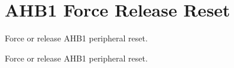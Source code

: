 \hypertarget{group___r_c_c_ex___a_h_b1___force___release___reset}{}\section{A\+H\+B1 Force Release Reset}
\label{group___r_c_c_ex___a_h_b1___force___release___reset}


Force or release A\+H\+B1 peripheral reset.  


Force or release A\+H\+B1 peripheral reset. 

